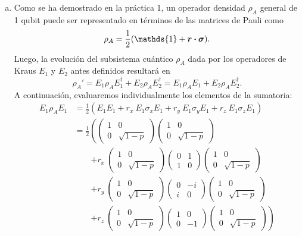 \documentclass{scrartcl}
\newcommand{\inv}[1]{\frac{1}{#1}}
\renewcommand{\vb}[1]{\bm{#1}}
\DeclareRobustCommand{\[}{\begin{equation}}
\DeclareRobustCommand{\]}{\end{equation}}
\begin{document}
\begin{enumerate}
\begin{enumerate}[a)]
        
        \item Como se ha demostrado en la práctica 1, un operador densidad $\rho_A$ general de 1 qubit puede ser representado en términos de las matrices de Pauli como
        \[ \rho_A = \inv{2} (\mathds{1} + \vb{r} \vdot \vb{\sigma}). \]
        Luego, la evolución del subsistema cuántico $\rho_A$ dada por los operadores de Kraus $E_1$ y $E_2$ antes definidos resultará en
        \[ \rho_A' = E_1 \rho_A E_1^\dagger + E_2 \rho_A E_2^\dagger = E_1 \rho_A E_1 + E_2 \rho_A E_2^\dagger. \]
        A continuación, evaluaremos individualmente los elementos de la sumatoria:
        \begin{align}
            E_1 \rho_A E_1 &= \inv{2} \left( E_1 E_1 + r_x \ E_1 \sigma_x E_1 + r_y \ E_1 \sigma_y E_1 + r_z \ E_1 \sigma_z E_1 \right) \\
                &= \inv{2} \left( \begin{pmatrix} 1 & 0 \\ 0 & \sqrt{1 - p} \end{pmatrix} \begin{pmatrix} 1 & 0 \\ 0 & \sqrt{1 - p} \end{pmatrix} \right. \\
                &\quad \quad \left. + r_x \ \begin{pmatrix} 1 & 0 \\ 0 & \sqrt{1 - p} \end{pmatrix} \begin{pmatrix} 0 & 1 \\ 1 & 0 \end{pmatrix} \begin{pmatrix} 1 & 0 \\ 0 & \sqrt{1 - p} \end{pmatrix} \right. \\
                &\quad \quad \left. + r_y \ \begin{pmatrix} 1 & 0 \\ 0 & \sqrt{1 - p} \end{pmatrix} \begin{pmatrix} 0 & -i \\ i & 0 \end{pmatrix} \begin{pmatrix} 1 & 0 \\ 0 & \sqrt{1 - p} \end{pmatrix} \right. \\
                &\quad \quad \left. + r_z \ \begin{pmatrix} 1 & 0 \\ 0 & \sqrt{1 - p} \end{pmatrix} \begin{pmatrix} 1 & 0 \\ 0 & -1 \end{pmatrix} \begin{pmatrix} 1 & 0 \\ 0 & \sqrt{1 - p} \end{pmatrix} \right) \\

\end{align}
\end{enumerate}
\end{enumerate}
\end{document}
